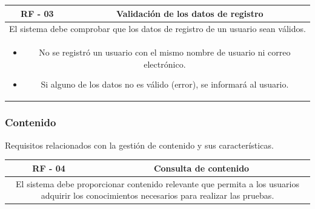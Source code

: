                 \begin{table}[!htbp]
                    \centering
                    \begin{tabular}{|c|c|}
                        \hline
                        \textbf{RF - 03} & \textbf{Validación de los datos de registro} \\
                        \hline
                        \multicolumn{2}{|p{15cm}|}{
                            El sistema debe comprobar que los datos de registro de un usuario sean válidos.
                        } \\
                        \hline
                        \multicolumn{2}{|p{15cm}|}{
                            \begin{itemize}
                                \item No se registró un usuario con el mismo nombre de usuario ni correo electrónico.
                                \item Si alguno de los datos no es válido (error), se informará al usuario.
                            \end{itemize}
                            } \\
                        \hline
                    \end{tabular}
                    \label{tab:RF3}
                \end{table}
            
            
            \subsubsection{Contenido}
            
                Requisitos relacionados con la gestión de contenido y sus características.
                
                \begin{table}[!htbp]
                    \centering
                    \begin{tabular}{|c|c|}
                        \hline
                        \textbf{RF - 04} & \textbf{Consulta de contenido} \\
                        \hline
                        \multicolumn{2}{|p{15cm}|}{
                            El sistema debe proporcionar contenido relevante que permita a los usuarios adquirir los conocimientos necesarios para realizar las pruebas.
                        } \\
                        \hline
                    \end{tabular}
                    \label{tab:RF4}
                \end{table}
                
